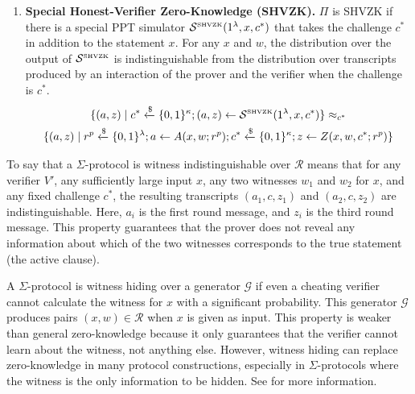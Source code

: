 \begin{definition}
\begin{enumerate}
    \item \textbf{Special Honest-Verifier Zero-Knowledge (SHVZK).} $\Pi$ is SHVZK if there is a special PPT simulator $\mathcal S^{\text{\tiny SHVZK}}(1^\lambda, x, c^*)$ that takes the challenge $c^*$ in addition to the statement $x$. For any $x$ and $w$, the distribution over the output of $\mathcal S^{\text{\tiny SHVZK}}$ is indistinguishable from the distribution over transcripts produced by an interaction of the prover and the verifier when the challenge is $c^*$.
    \begin{multline*}
        \{(a, z) \mid c^* \xleftarrow{\$} \{0,1\}^\kappa; (a,z) \leftarrow \mathcal S^{\text{\tiny SHVZK}}(1^\lambda,x,c^*)\} 
        \approx_{c^*} \\
        \{(a,z) \mid r^p \xleftarrow{\$} \{0,1\}^\lambda; a \leftarrow A(x,w;r^p); c^* \xleftarrow{\$} \{0,1\}^\kappa; z \leftarrow Z(x,w,c^*;r^p)\}
    \end{multline*}
\end{enumerate}
\end{definition}

\begin{definition}\label{def:wi}
To say that a $\Sigma$-protocol is witness indistinguishable over $\mathcal R$ means that for any verifier $V'$, any sufficiently large input $x$, any two witnesses $w_1$ and $w_2$ for $x$, and any fixed challenge $c^*$, the resulting transcripts $(a_1, c, z_1)$ and $(a_2,c,z_2)$ are indistinguishable. Here, $a_i$ is the first round message, and $z_i$ is the third round message. This property guarantees that the prover does not reveal any information about which of the two witnesses corresponds to the true statement (the active clause).
\end{definition}

\begin{definition}\label{def:wh}
A $\Sigma$-protocol is witness hiding over a generator $\mathcal G$ if even a cheating verifier cannot calculate the witness for $x$ with a significant probability. This generator $\mathcal G$ produces pairs $(x,w) \in \mathcal R$ when $x$ is given as input. This property is weaker than general zero-knowledge because it only guarantees that the verifier cannot learn about the witness, not anything else. However, witness hiding can replace zero-knowledge in many protocol constructions, especially in $\Sigma$-protocols where the witness is the only information to be hidden. See \cite{10.1145/100216.100272} for more information.
\end{definition}

